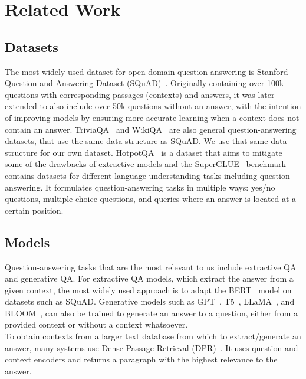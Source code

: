 \documentclass[fleqn,moreauthors,10pt]{ds_report}
\begin{document}
\section*{Related Work}

\subsection*{Datasets}

The most widely used dataset for open-domain question answering is Stanford Question and Answering Dataset (SQuA\-D)~\cite{rajpurkar2016squad, rajpurkar2018squadv2}.
Originally containing over 100k questions with corresponding passages (contexts) and answers, it was later extended to also include over 50k questions without an answer, with the intention of improving models by ensuring more accurate learning when a context does not contain an answer.
TriviaQA~\cite{joshi2017triviaqa} and WikiQA~\cite{yang2015wikiqa} are also general question-answering datasets, that use the same data structure as SQuAD. We use that same data structure for our own dataset.
HotpotQA~\cite{yang2018hotpotqa} is a dataset that aims to mitigate some of the drawbacks of extractive models and the SuperGLUE~\cite{SuperGLUE} benchmark contains datasets for different language understanding tasks including question answering. 
It formulates question-answering tasks in multiple ways: yes/no questions, multiple choice questions, and queries where an answer is located at a certain position.

\subsection*{Models}
Question-answering tasks that are the most relevant to us include extractive QA and generative QA.
For extractive QA models, which extract the answer from a given context, the most widely used approach is to adapt the BERT~\cite{devlin2019bert} model on datasets such as SQuAD.
Generative models such as GPT~\cite{openai2023gpt4}, T5~\cite{T5}, LLaMA~\cite{touvron2023llama}, and BLOOM~\cite{scao2022bloom}, can also be trained to generate an answer to a question, either from a provided context or without a context whatsoever. \\
To obtain contexts from a larger text database from which to extract/generate an answer, many systems use Dense Passage Retrieval (DPR)~\cite{karpukhin2020dense}.
It uses question and context encoders and returns a paragraph with the highest relevance to the answer.
\end{document}
